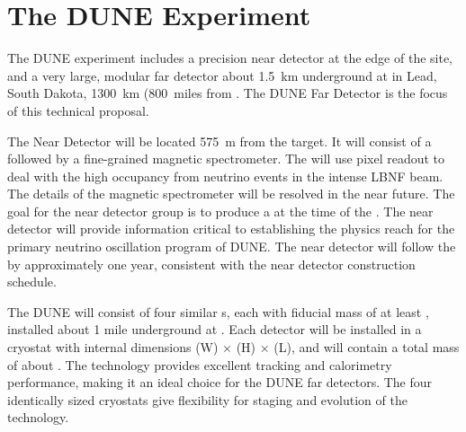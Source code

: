 \section{The DUNE Experiment} %


The DUNE experiment includes a precision near detector at the edge of the \fnal site, and a very large, modular far detector about \SI{1.5}{km} underground at \surf in Lead, South Dakota, \SI{1300}{km} (\SI{800}{miles} from \fnal. The DUNE Far Detector is the focus of this technical proposal. 

The Near Detector will be located \SI{575}{m} from the target. It will consist of a \lartpc followed by a fine-grained magnetic spectrometer. The \lartpc will use pixel readout to deal with the high occupancy from neutrino events in the intense LBNF beam. The details of the magnetic spectrometer will be resolved in the near future. The goal for the near detector group is to produce a  at the time of the  . The near detector  will provide information critical to establishing the physics reach for the primary neutrino oscillation program of DUNE. The near detector  will follow the   by approximately one year, consistent with the near detector construction schedule.

The DUNE  will consist of four similar \lartpc{}s, each with fiducial mass of at least \nominalmodsize, installed about 1 mile underground at \surf. Each detector will be installed in a cryostat with internal dimensions
\cryostatwdth (W) $\times$ \cryostatht (H) $\times$ \cryostatlen (L), and will contain a total \lar{} mass of about \larmass{}.
The \lartpc technology provides
excellent tracking and calorimetry performance, making it an ideal
choice for the DUNE far detectors. The four identically sized cryostats give flexibility for staging and evolution of the \lartpc technology.

